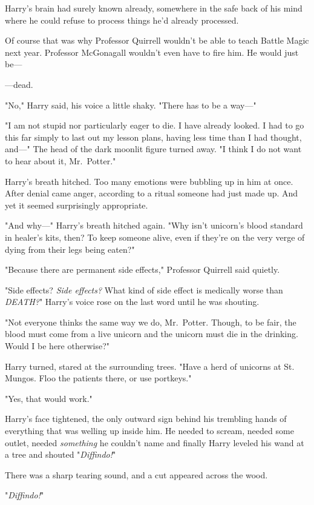 Harry's brain had surely known already, somewhere in the safe back of his mind
where he could refuse to process things he'd already processed.

Of course that was why Professor Quirrell wouldn't be able to teach Battle
Magic next year. Professor McGonagall wouldn't even have to fire him. He would
just be---

---dead.

"No," Harry said, his voice a little shaky. "There has to be a way---"

"I am not stupid nor particularly eager to die. I have already looked. I had to
go this far simply to last out my lesson plans, having less time than I had
thought, and---" The head of the dark moonlit figure turned away. "I think I do
not want to hear about it, Mr.~Potter."

Harry's breath hitched. Too many emotions were bubbling up in him at once.
After denial came anger, according to a ritual someone had just made up. And
yet it seemed surprisingly appropriate.

"And why---" Harry's breath hitched again. "Why isn't unicorn's blood standard
in healer's kits, then? To keep someone alive, even if they're on the very
verge of dying from their legs being eaten?"

"Because there are permanent side effects," Professor Quirrell said quietly.

"Side effects? \emph{Side effects?} What kind of side effect is medically worse
than \emph{DEATH?}" Harry's voice rose on the last word until he was shouting.

"Not everyone thinks the same way we do, Mr.~Potter. Though, to be fair, the
blood must come from a live unicorn and the unicorn must die in the drinking.
Would I be here otherwise?"

Harry turned, stared at the surrounding trees. "Have a herd of unicorns at St.
Mungos. Floo the patients there, or use portkeys."

"Yes, that would work."

Harry's face tightened, the only outward sign behind his trembling hands of
everything that was welling up inside him. He needed to scream, needed some
outlet, needed \emph{something} he couldn't name and finally Harry leveled his
wand at a tree and shouted "\emph{Diffindo!}"

There was a sharp tearing sound, and a cut appeared across the wood.

"\emph{Diffindo!}"

